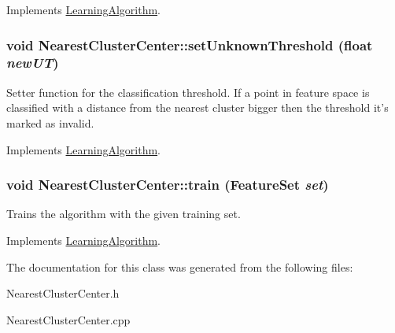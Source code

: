 Implements \hyperlink{classLearningAlgorithm}{LearningAlgorithm}.\hypertarget{classNearestClusterCenter_ab902e7abfb704d132d8548672253bb0a}{
\subsubsection[{setUnknownThreshold}]{\setlength{\rightskip}{0pt plus 5cm}void NearestClusterCenter::setUnknownThreshold (float {\em newUT})}}
\label{classNearestClusterCenter_ab902e7abfb704d132d8548672253bb0a}
Setter function for the classification threshold. If a point in feature space is classified with a distance from the nearest cluster bigger then the threshold it's marked as invalid. 

Implements \hyperlink{classLearningAlgorithm}{LearningAlgorithm}.\hypertarget{classNearestClusterCenter_af3a9ba6b9ef3fb453ff10e76fe34e9d4}{
\subsubsection[{train}]{\setlength{\rightskip}{0pt plus 5cm}void NearestClusterCenter::train (FeatureSet {\em set})}}
\label{classNearestClusterCenter_af3a9ba6b9ef3fb453ff10e76fe34e9d4}
Trains the algorithm with the given training set. 

Implements \hyperlink{classLearningAlgorithm}{LearningAlgorithm}.

The documentation for this class was generated from the following files:\begin{DoxyCompactItemize}
\item 
NearestClusterCenter.h\item 
NearestClusterCenter.cpp\end{DoxyCompactItemize}
